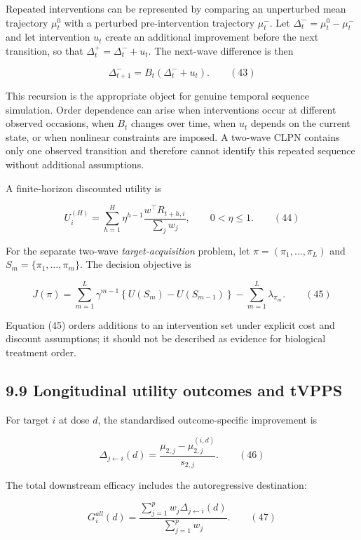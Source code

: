 \documentclass[11pt]{article}
\begin{document}
Repeated interventions can be represented by comparing an unperturbed
mean trajectory \(\mu_{t}^{0}\) with a perturbed pre-intervention
trajectory \(\mu_{t}^{-}\). Let
\(\Delta_{t}^{-} = \mu_{t}^{0} - \mu_{t}^{-}\) and let intervention
\(u_{t}\) create an additional improvement before the next transition,
so that \(\Delta_{t}^{+} = \Delta_{t}^{-} + u_{t}\). The next-wave
difference is then

\[\Delta_{t + 1}^{-} = B_{t}\left( \Delta_{t}^{-} + u_{t} \right).\quad\quad(43)\]

This recursion is the appropriate object for genuine temporal sequence
simulation. Order dependence can arise when interventions occur at
different observed occasions, when \(B_{t}\) changes over time, when
\(u_{t}\) depends on the current state, or when nonlinear constraints
are imposed. A two-wave CLPN contains only one observed transition and
therefore cannot identify this repeated sequence without additional
assumptions.

A finite-horizon discounted utility is

\[U_{i}^{(H)} = \sum_{h = 1}^{H}\eta^{h - 1}\frac{w^{\top}R_{t + h,i}}{\sum_{j}^{}w_{j}},\quad\quad 0 < \eta \leq 1.\quad\quad(44)\]

For the separate two-wave \emph{target-acquisition} problem, let
\(\pi = \left( \pi_{1},\ldots,\pi_{L} \right)\) and
\(S_{m} = \{\pi_{1},\ldots,\pi_{m}\}\). The decision objective is

\[J(\pi) = \sum_{m = 1}^{L}\gamma^{m - 1}\left\{ U\left( S_{m} \right) - U\left( S_{m - 1} \right) \right\} - \sum_{m = 1}^{L}\lambda_{\pi_{m}}.\quad\quad(45)\]

Equation (45) orders additions to an intervention set under explicit
cost and discount assumptions; it should not be described as evidence
for biological treatment order.

\subsection{9.9 Longitudinal utility outcomes and
tVPPS}\label{longitudinal-utility-outcomes-and-tvpps}

For target \(i\) at dose \(d\), the standardised outcome-specific
improvement is

\[\Delta_{j \leftarrow i}(d) = \frac{\mu_{2,j} - \mu_{2,j}^{(i,d)}}{s_{2,j}}.\quad\quad(46)\]

The total downstream efficacy includes the autoregressive destination:

\[G_{i}^{all}(d) = \frac{\sum_{j = 1}^{p}w_{j}\Delta_{j \leftarrow i}(d)}{\sum_{j = 1}^{p}w_{j}}.\quad\quad(47)\]
\end{document}
